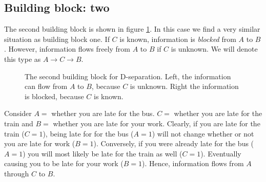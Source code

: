 \subsection{Building block: two}
The second building block is shown in figure \ref{fig:building_block_two}.
In this case we find a very similar situation as building block one.
If $C$ is known, information is \textit{blocked} from $A$ to $B$.
However, information flows freely from $A$ to $B$ if $C$ is unknown.
We will denote this type as $A \rightarrow C \rightarrow B$.

\begin{figure}[h!]
\centering
\begin{minipage}{0.4\textwidth}
\end{minipage}
\begin{minipage}{0.4\textwidth}
\end{minipage}
\caption{The second building block for D-separation. 
Left, the information can flow from $A$ to $B$, because $C$
is unknown. Right the 
information is blocked, because $C$
is known.}
\label{fig:building_block_two}
\end{figure}
\begin{exmp}
Consider $A=$ whether you are late for the bus. $C =$ whether you are 
late for the train and $B = $ whether you are late for your work. 
Clearly, if you are late for the train ($C = 1$), being late for
for the bus ($A=1$) will not change whether or not you are late
for work ($B = 1$). Conversely, if you were already late for the bus
($A = 1$) you will most likely be late for the train as well ($C=1$).
Eventually causing you to be late for your work ($B =1$). Hence,
information flows from $A$ through $C$ to $B$.
\end{exmp}

